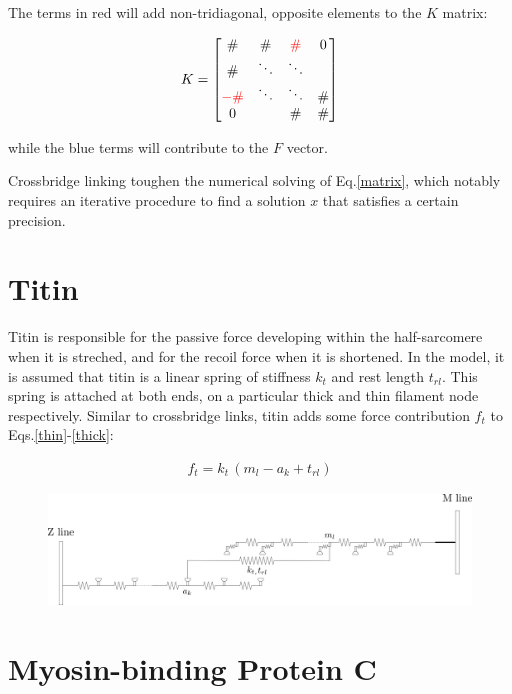 \documentclass[a4paper,11pt]{article}
\begin{document}
\noindent The terms in red will add non-tridiagonal, opposite elements to the $K$ matrix:

\begin{eqnarray*}
K = \left [ \begin{matrix}
\# & \# & \color{red}{\#} & 0 \\
\# & \ddots & \ddots &  \\
\color{red}{-\#} & \ddots & \ddots &  \# \\
0 &  & \# & \#  
\end{matrix}  
\right]
\end{eqnarray*} 


\noindent while the blue terms will contribute to the $F$ vector. 

\noindent Crossbridge linking toughen the numerical solving of Eq.\eqref{matrix}, which notably requires an iterative procedure to find a solution $x$ that satisfies a certain precision. 


\section{Titin}

Titin is responsible for the passive force developing within the half-sarcomere when it is streched, and for the recoil force when it is shortened. In the model, it is assumed that titin is a linear spring of stiffness $k_t$ and rest length $t_{rl}$. This spring is attached at both ends, on a particular thick and thin filament node respectively. Similar to crossbridge links, titin adds some force contribution $f_{t}$ to Eqs.\eqref{thin}-\eqref{thick}:

\begin{eqnarray}
f_{t} = k_{t} \, (m_l - a_k + t_{rl})
\label{titin}
\end{eqnarray}

\begin{figure}
\begin{center}
\includegraphics[width=16cm]{Pictures/titin.png}
\end{center}
\end{figure}

\section{Myosin-binding Protein C}
\end{document}
